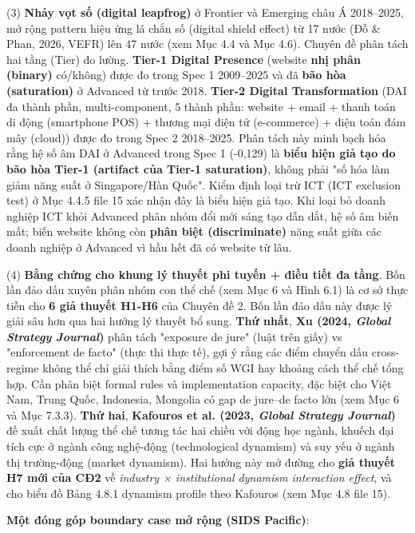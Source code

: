 \documentclass[12pt,a4paper]{article}
\begin{document}
(3) \textbf{Nhảy vọt số (digital leapfrog)} ở Frontier và Emerging châu
Á 2018--2025, mở rộng pattern hiệu ứng lá chắn số (digital shield
effect) từ 17 nước (Đỗ \& Phan, 2026, VEFR) lên 47 nước (xem Mục 4.4 và
Mục 4.6). Chuyên đề phân tách hai tầng (Tier) đo lường. \textbf{Tier-1
Digital Presence} (website \textbf{nhị phân (binary)} có/không) được đo
trong Spec 1 2009--2025 và đã \textbf{bão hòa (saturation)} ở Advanced
từ trước 2018. \textbf{Tier-2 Digital Transformation} (DAI đa thành
phần, multi-component, 5 thành phần: website + email + thanh toán di
động (smartphone POS) + thương mại điện tử (e-commerce) + điện toán đám
mây (cloud)) được đo trong Spec 2 2018--2025. Phân tách này minh bạch
hóa rằng hệ số âm DAI ở Advanced trong Spec 1 (-0,129) là \textbf{biểu
hiện giả tạo do bão hòa Tier-1 (artifact của Tier-1 saturation)}, không
phải "số hóa làm giảm năng suất ở Singapore/Hàn Quốc". Kiểm định loại
trừ ICT (ICT exclusion test) ở Mục 4.4.5 file 15 xác nhận đây là biểu
hiện giả tạo. Khi loại bỏ doanh nghiệp ICT khỏi Advanced phân nhóm đổi
mới sáng tạo dẫn dắt, hệ số âm biến mất; biến website không còn
\textbf{phân biệt (discriminate)} năng suất giữa các doanh nghiệp ở
Advanced vì hầu hết đã có website từ lâu.

(4) \textbf{Bằng chứng cho khung lý thuyết phi tuyến + điều tiết đa
tầng}. Bốn lần đảo dấu xuyên phân nhóm con thể chế (xem Mục 6 và Hình
6.1) là cơ sở thực tiễn cho \textbf{6 giả thuyết H1-H6} của Chuyên đề 2.
Bốn lần đảo dấu này được lý giải sâu hơn qua hai hướng lý thuyết bổ
sung. \textbf{Thứ nhất}, \textbf{Xu (2024, \emph{Global Strategy
Journal})} phân tách "exposure de jure" (luật trên giấy) vs "enforcement
de facto" (thực thi thực tế), gợi ý rằng các điểm chuyển dấu
cross-regime không thể chỉ giải thích bằng điểm số WGI hay khoảng cách
thể chế tổng hợp. Cần phân biệt formal rules và implementation capacity,
đặc biệt cho Việt Nam, Trung Quốc, Indonesia, Mongolia có gap de
jure--de facto lớn (xem Mục 6 và Mục 7.3.3). \textbf{Thứ hai},
\textbf{Kafouros et al. (2023, \emph{Global Strategy Journal})} đề xuất
chất lượng thể chế tương tác hai chiều với động học ngành, khuếch đại
tích cực ở ngành công nghệ-động (technological dynamism) và suy yếu ở
ngành thị trường-động (market dynamism). Hai hướng này mở đường cho
\textbf{giả thuyết H7 mới của CĐ2} về \emph{industry × institutional
dynamism interaction effect}, và cho biểu đồ Bảng 4.8.1 dynamism profile
theo Kafouros (xem Mục 4.8 file 15).

\textbf{Một đóng góp boundary case mở rộng (SIDS Pacific)}:
\end{document}
